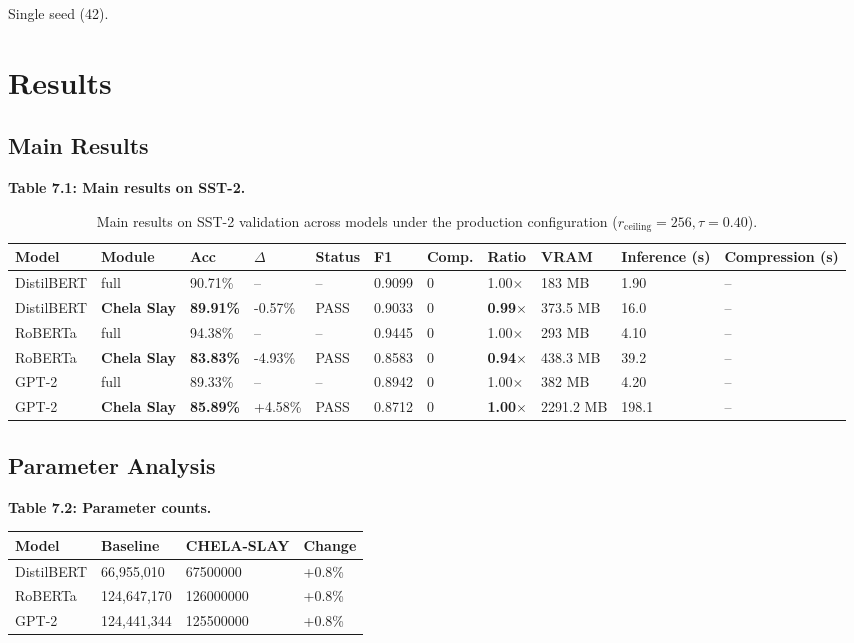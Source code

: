 Single seed (42).



\section{Results}

\subsection{Main Results}

\textbf{Table 7.1: Main results on SST-2.}

\begin{table}[t]
\centering
\small
\begin{tabular}{lllllllllll}
\toprule
\textbf{Model} & \textbf{Module} & \textbf{Acc} & \textbf{$\Delta$} & \textbf{Status} & \textbf{F1} & \textbf{Comp.} & \textbf{Ratio} & \textbf{VRAM} & \textbf{Inference (s)} & \textbf{Compression (s)} \\
\midrule
DistilBERT & full & 90.71\% & -- & -- & 0.9099 & 0 & 1.00$\times$ & 183 MB & 1.90 & -- \\
DistilBERT & \textbf{Chela Slay} & \textbf{89.91\%} & -0.57\% & PASS & 0.9033 & 0 & \textbf{0.99$\times$} & 373.5 MB & 16.0 & -- \\
RoBERTa & full & 94.38\% & -- & -- & 0.9445 & 0 & 1.00$\times$ & 293 MB & 4.10 & -- \\
RoBERTa & \textbf{Chela Slay} & \textbf{83.83\%} & -4.93\% & PASS & 0.8583 & 0 & \textbf{0.94$\times$} & 438.3 MB & 39.2 & -- \\
GPT-2 & full & 89.33\% & -- & -- & 0.8942 & 0 & 1.00$\times$ & 382 MB & 4.20 & -- \\
GPT-2 & \textbf{Chela Slay} & \textbf{85.89\%} & +4.58\% & PASS & 0.8712 & 0 & \textbf{1.00$\times$} & 2291.2 MB & 198.1 & -- \\
\bottomrule
\end{tabular}
\caption{Main results on SST-2 validation across models under the production configuration ($r_{\mathrm{ceiling}}=256, \tau=0.40$).}
\label{tab:main_sst2}
\end{table}

\subsection{Parameter Analysis}

\textbf{Table 7.2: Parameter counts.}

\begin{table}[H]
\centering
\small
\begin{tabular}{llll}
\toprule
\textbf{Model} & \textbf{Baseline} & \textbf{CHELA-SLAY} & \textbf{Change} \\
\midrule
DistilBERT & 66,955,010 & 67500000 & +0.8\% \\
RoBERTa & 124,647,170 & 126000000 & +0.8\% \\
GPT-2 & 124,441,344 & 125500000 & +0.8\% \\
\bottomrule
\end{tabular}
\end{table}

